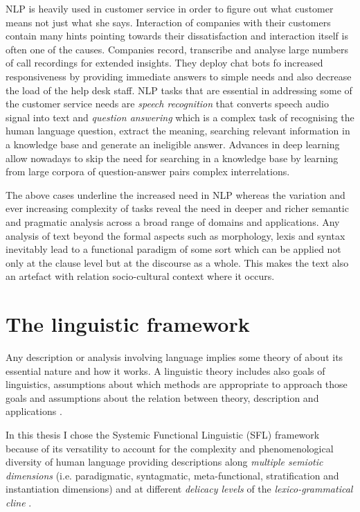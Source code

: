 NLP is heavily used in customer service in order to figure out what customer means not just what she says. Interaction of companies with their customers contain many hints pointing towards their dissatisfaction and interaction itself is often one of the causes. Companies record, transcribe and analyse large numbers of call recordings for extended insights. They deploy chat bots fo increased responsiveness by providing immediate answers to simple needs and also decrease the load of the help desk staff. NLP tasks that are essential in addressing some of the customer service needs are \textit{speech recognition} that converts speech audio signal into text and \textit{question answering} which is a complex task of recognising the human language question, extract the meaning, searching relevant information in a knowledge base and generate an ineligible answer. Advances in deep learning allow nowadays to skip the need for searching in a knowledge base by learning from large corpora of question-answer pairs complex interrelations. 

The above cases underline the increased need in NLP whereas the variation and ever increasing complexity of tasks reveal the need in deeper and richer semantic and pragmatic analysis across a broad range of domains and applications. Any analysis of text beyond the formal aspects such as morphology, lexis and syntax inevitably lead to a functional paradigm of some sort which can be applied not only at the clause level but at the discourse as a whole. This makes the text also an artefact with relation socio-cultural context where it occurs. 

\section{The linguistic framework}
Any description or analysis involving language implies some theory of about its essential nature and how it works. A linguistic theory includes also goals of linguistics, assumptions about which methods are appropriate to approach those goals and assumptions about the relation between theory, description and applications \citep{Fawcett2000}. 

In this thesis I chose the Systemic Functional Linguistic (SFL) framework because of its versatility to account for the complexity and phenomenological diversity of human language providing descriptions along \textit{multiple semiotic dimensions} \citep{Halliday2003} (i.e. paradigmatic, syntagmatic, meta-functional, stratification and instantiation dimensions) and at different \textit{delicacy levels} of the \textit{lexico-grammatical cline} \citep{Halliday2002, Hasan2014}. 

